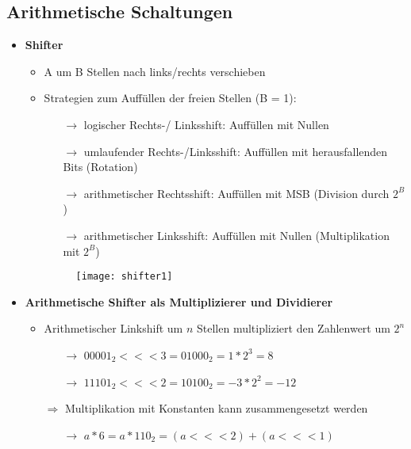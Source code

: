 \subsection{Arithmetische Schaltungen}
\begin{itemize}

\item \textbf{Shifter}
	\begin{itemize}
	\item A um B Stellen nach links/rechts verschieben
	\item Strategien zum Auffüllen der freien Stellen (B = 1):
		\begin{itemize}
		\item[$\rightarrow$] logischer Rechts-/ Linksshift: Auffüllen mit Nullen
		\item[$\rightarrow$] umlaufender Rechts-/Linksshift: Auffüllen mit herausfallenden Bits (Rotation)
		\item[$\rightarrow$] arithmetischer Rechtsshift: Auffüllen mit MSB (Division durch $2^B$)
		\item[$\rightarrow$] arithmetischer Linksshift: Auffüllen mit Nullen (Multiplikation mit $2^B$)
		\end{itemize}
	\item[]
		\begin{figure}[H]
			\begin{center}
			\texttt{[image: shifter1]}
			\end{center}
		\end{figure}
	\end{itemize}
	
\pagebreak	
	
\item \textbf{Arithmetische Shifter als Multiplizierer und Dividierer}
	\begin{itemize}
	\item Arithmetischer Linkshift um $n$ Stellen multipliziert den Zahlenwert um $2^n$
		\begin{itemize}
		\item[$\rightarrow$] $00001_2 <<< 3 = 01000_2 = 1 * 2^3 = 8$
		\item[$\rightarrow$] $11101_2 <<< 2 = 10100_2 = -3 * 2^2 = -12$
		\end{itemize}
	
	\item[$\Rightarrow$] Multiplikation mit Konstanten kann zusammengesetzt werden
		\begin{itemize}
		\item[$\rightarrow$] $a * 6 = a* 110_2 = (a <<< 2) + (a <<< 1)$
		\end{itemize}
	

\end{itemize}
\end{itemize}
